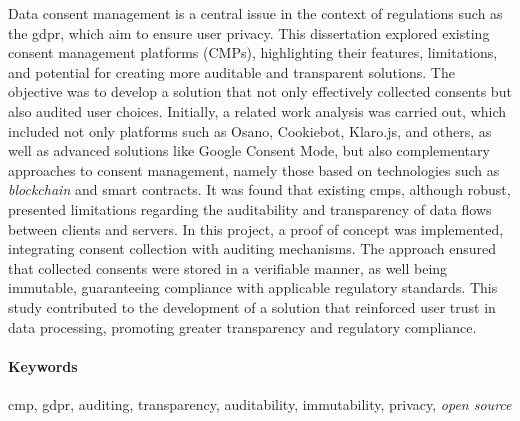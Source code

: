Data consent management is a central issue in the context of regulations such as the \acrfull{gdpr}, which aim to ensure user privacy. This dissertation explored existing consent management platforms (CMPs), highlighting their features, limitations, and potential for creating more auditable and transparent solutions. The objective was to develop a solution that not only effectively collected consents but also audited user choices. 
Initially, a related work analysis was carried out, which included not only platforms such as Osano, Cookiebot, Klaro.js, and others, as well as advanced solutions like Google Consent Mode, but also complementary approaches to consent management, namely those based on technologies such as \textit{blockchain} and smart contracts. It was found that existing \acrshort{cmp}s, although robust, presented limitations regarding the auditability and transparency of data flows between clients and servers.
In this project, a proof of concept was implemented, integrating consent collection with auditing mechanisms. The approach ensured that collected consents were stored in a verifiable manner, as well being immutable, guaranteeing compliance with applicable regulatory standards. This study contributed to the development of a solution that reinforced user trust in data processing, promoting greater transparency and regulatory compliance.

\paragraph{Keywords} \acrshort{cmp}, \acrshort{gdpr}, auditing, transparency, auditability, immutability, privacy, \textit{open source}

\cleardoublepage
